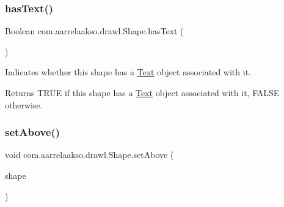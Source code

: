 \mbox{\label{classcom_1_1aarrelaakso_1_1drawl_1_1_shape_a037a5515b2a6e1df1d1981aa5516e78e}} 
\subsubsection{\texorpdfstring{has\+Text()}{hasText()}}
{\footnotesize\ttfamily Boolean com.\+aarrelaakso.\+drawl.\+Shape.\+has\+Text (\begin{DoxyParamCaption}{ }\end{DoxyParamCaption})\hspace{0.3cm}{\ttfamily [inherited]}}



Indicates whether this shape has a \hyperlink{classcom_1_1aarrelaakso_1_1drawl_1_1_text}{Text} object associated with it. 

\begin{DoxyReturn}{Returns}
T\+R\+UE if this shape has a \hyperlink{classcom_1_1aarrelaakso_1_1drawl_1_1_text}{Text} object associated with it, F\+A\+L\+SE otherwise. 
\end{DoxyReturn}
\mbox{\label{classcom_1_1aarrelaakso_1_1drawl_1_1_shape_a4deb22d64fef2115a0bc4802e8dba682}} 
\subsubsection{\texorpdfstring{set\+Above()}{setAbove()}\hspace{0.1cm}{\footnotesize\ttfamily [1/2]}}
{\footnotesize\ttfamily void com.\+aarrelaakso.\+drawl.\+Shape.\+set\+Above (\begin{DoxyParamCaption}\item[{@Not\+Null final \hyperlink{classcom_1_1aarrelaakso_1_1drawl_1_1_shape}{Shape}}]{shape }\end{DoxyParamCaption})\hspace{0.3cm}{\ttfamily [inherited]}}



